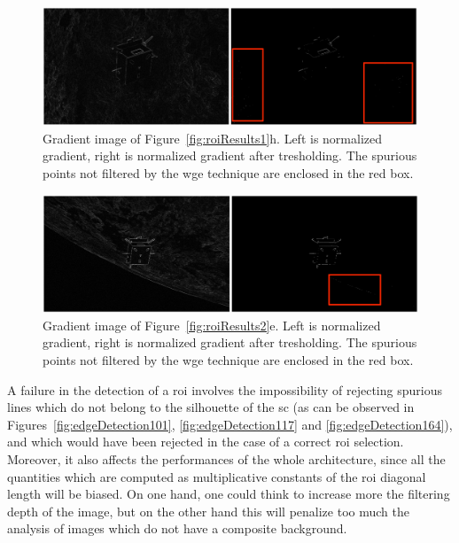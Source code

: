 \begin{figure}[htpb]
  \centering
  \includegraphics[width=1.0\textwidth]{gfx/results/prisma/117/8Select.png}
  \caption{Gradient image of Figure~\ref{fig:roiResults1}h. Left is normalized gradient, right is normalized gradient after tresholding. The spurious points not filtered by the \acrshort{wge} technique are enclosed in the red box.}
\end{figure}

\begin{figure}[htpb]
  \centering
  \includegraphics[width=1.0\textwidth]{gfx/results/prisma/164/8Select.png}
  \caption{Gradient image of Figure~\ref{fig:roiResults2}e. Left is normalized gradient, right is normalized gradient after tresholding. The spurious points not filtered by the \acrshort{wge} technique are enclosed in the red box.}
\end{figure}

A failure in the detection of a \acrshort{roi} involves the impossibility of rejecting spurious lines which do not belong to the silhouette of the \acrshort{sc} (as can be observed in Figures~\ref{fig:edgeDetection101}, \ref{fig:edgeDetection117} and \ref{fig:edgeDetection164}), and which would have been rejected in the case of a correct \acrshort{roi} selection. Moreover, it also affects the performances of the whole architecture, since all the quantities which are computed as multiplicative constants of the \acrshort{roi} diagonal length will be biased. On one hand, one could think to increase more the filtering depth of the image, but on the other hand this will penalize too much the analysis of images which do not have a composite background.

